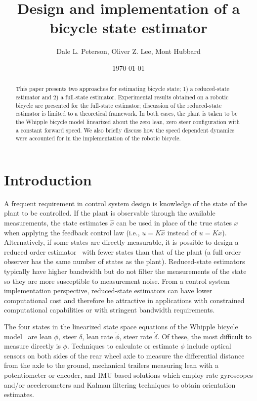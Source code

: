 \documentclass[letterpaper,11pt]{article}
\begin{document}
\title{Design and implementation of a bicycle state estimator}
\author{Dale L. Peterson, Oliver Z. Lee, Mont Hubbard}
\date{\today}
\maketitle

\begin{abstract}
This paper presents two approaches for estimating bicycle state; 1) a
reduced-state estimator and 2) a full-state estimator. Experimental results
obtained on a robotic bicycle are presented for the full-state estimator;
discussion of the reduced-state estimator is limited to a theoretical
framework. In both cases, the plant is taken to be the Whipple bicycle model
linearized about the zero lean, zero steer configuration with a constant
forward speed.  We also briefly discuss how the speed dependent dynamics were
accounted for in the implementation of the robotic bicycle.
\end{abstract}

\section{Introduction} \label{sec:introduction}
A frequent requirement in control system design is knowledge of the state of
the plant to be controlled. If the plant is observable through the available
measurements, the state estimates $\hat{x}$ can be used in place of the true
states $x$ when applying the feedback control law (i.e., $u=K\hat{x}$ instead
of $u=Kx$). Alternatively, if some states are directly measurable, it is
possible to design a reduced order estimator~\cite{Bryson1970} with fewer
states than that of the plant (a full order observer has the same number of
states as the plant).  Reduced-state estimators typically have higher bandwidth
but do not filter the measurements of the state so they are more susceptible to
measurement noise.  From a control system implementation perspective,
reduced-state estimators can have lower computational cost and therefore be
attractive in applications with constrained computational capabilities or with
stringent bandwidth requirements.

The four states in the linearized state space equations of the Whipple bicycle
model~\cite{Meijaard2007} are lean $\phi$, steer $\delta$, lean rate $\dot{\phi}$, steer rate
$\dot{\delta}$.  Of these, the most difficult to measure directly is $\phi$.
Techniques to calculate or estimate $\phi$ include optical sensors on both sides
of the rear wheel axle to measure the differential distance from the axle to the ground,
mechanical trailers measuring lean with a potentiometer or encoder, and IMU
based solutions which employ rate gyroscopes and/or accelerometers and Kalman
filtering techniques to obtain orientation estimates\cite{Boniolo2008}.
\end{document}
